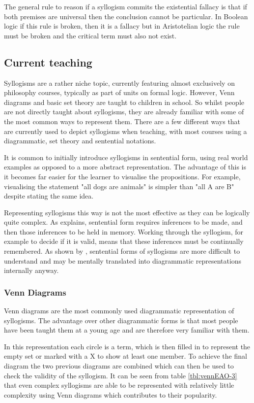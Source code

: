 \documentclass[12pt,a4paper]{report}
\begin{document}
The general rule to reason if a syllogism commits the existential fallacy is that if both premises are universal then the conclusion cannot be particular. In Boolean logic if this rule is broken, then it is a fallacy but in Aristotelian logic the rule must be broken and the critical term must also not exist.

\subsection{Current teaching}
Syllogisms are a rather niche topic, currently featuring almost exclusively on philosophy courses, typically as part of units on formal logic. However, Venn diagrams and basic set theory are taught to children in school. So whilst people are not directly taught about syllogisms, they are already familiar with some of the most common ways to represent them.
There are a few different ways that are currently used to depict syllogisms when teaching, with most courses using a diagrammatic, set theory and sentential notations.
 
It is common to initially introduce syllogisms in sentential form, using real world examples as opposed to a more abstract representation. The advantage of this is it becomes far easier for the learner to visualise the propositions. For example, visualising the statement "all dogs are animals" is simpler than "all A are B" despite stating the same idea. 

Representing syllogisms this way is not the most effective as they can be logically quite complex. As \citep{larkin1987diagram} explains, sentential form requires inferences to be made, and then those inferences to be held in memory. Working through the syllogism, for example to decide if it is valid, means that these inferences must be continually remembered. As shown by \cite{johnson1980mental}, sentential forms of syllogisms are more difficult to understand and may be mentally translated into diagrammatic representations internally anyway. 

\subsubsection{Venn Diagrams}
Venn diagrams are the most commonly used diagrammatic representation of syllogisms. The advantage over other diagrammatic forms is that most people have been taught them at a young age and are therefore very familiar with them. 

In this representation each circle is a term, which is then filled in to represent the empty set or marked with a X to show at least one member. To achieve the final diagram the two previous diagrams are combined which can then  be used to check the validity of the syllogism. It can be seen from table \ref{tbl:vennEAO-3} that even complex syllogisms are able to be represented with relatively little complexity using Venn diagrams which contributes to their popularity. 
\end{document}
